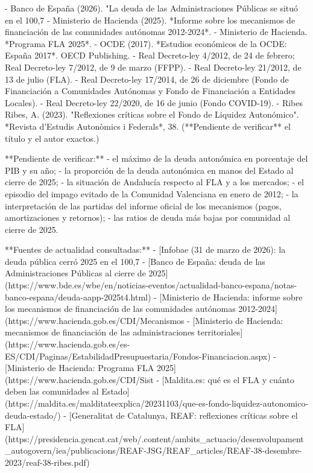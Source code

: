 \documentclass[10pt,a4paper]{article}
\begin{document}
{- Banco de España (2026). "La deuda de las Administraciones Públicas se situó en el 100,7%
- Ministerio de Hacienda (2025). *Informe sobre los mecanismos de financiación de las comunidades autónomas 2012-2024*.
- Ministerio de Hacienda. *Programa FLA 2025*.
- OCDE (2017). *Estudios económicos de la OCDE: España 2017*. OECD Publishing.
- Real Decreto-ley 4/2012, de 24 de febrero; Real Decreto-ley 7/2012, de 9 de marzo (FFPP).
- Real Decreto-ley 21/2012, de 13 de julio (FLA).
- Real Decreto-ley 17/2014, de 26 de diciembre (Fondo de Financiación a Comunidades Autónomas y Fondo de Financiación a Entidades Locales).
- Real Decreto-ley 22/2020, de 16 de junio (Fondo COVID-19).
- Ribes Ribes, A. (2023). "Reflexiones críticas sobre el Fondo de Liquidez Autonómico". *Revista d'Estudis Autonòmics i Federals*, 38. (**Pendiente de verificar** el título y el autor exactos.)

**Pendiente de verificar:**
- el máximo de la deuda autonómica en porcentaje del PIB y su año;
- la proporción de la deuda autonómica en manos del Estado al cierre de 2025;
- la situación de Andalucía respecto al FLA y a los mercados;
- el episodio del impago evitado de la Comunidad Valenciana en enero de 2012;
- la interpretación de las partidas del informe oficial de los mecanismos (pagos, amortizaciones y retornos);
- las ratios de deuda más bajas por comunidad al cierre de 2025.

**Fuentes de actualidad consultadas:**
- [Infobae (31 de marzo de 2026): la deuda pública cerró 2025 en el 100,7%
- [Banco de España: deuda de las Administraciones Públicas al cierre de 2025](https://www.bde.es/wbe/en/noticias-eventos/actualidad-banco-espana/notas-banco-espana/deuda-aapp-2025t4.html)
- [Ministerio de Hacienda: informe sobre los mecanismos de financiación de las comunidades autónomas 2012-2024](https://www.hacienda.gob.es/CDI/Mecanismos%
- [Ministerio de Hacienda: mecanismos de financiación de las administraciones territoriales](https://www.hacienda.gob.es/es-ES/CDI/Paginas/EstabilidadPresupuestaria/Fondos-Financiacion.aspx)
- [Ministerio de Hacienda: Programa FLA 2025](https://www.hacienda.gob.es/CDI/Sist%
- [Maldita.es: qué es el FLA y cuánto deben las comunidades al Estado](https://maldita.es/malditateexplica/20231103/que-es-fondo-liquidez-autonomico-deuda-estado/)
- [Generalitat de Catalunya, REAF: reflexiones críticas sobre el FLA](https://presidencia.gencat.cat/web/.content/ambits_actuacio/desenvolupament_autogovern/iea/publicacions/REAF-JSG/REAF_articles/REAF-38-desembre-2023/reaf-38-ribes.pdf)

}
\end{document}

